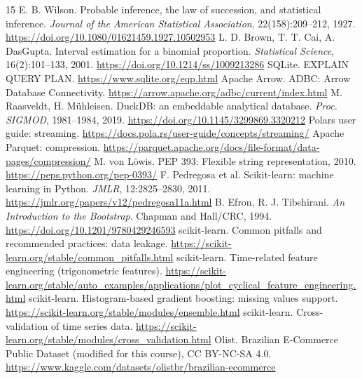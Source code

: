 \documentclass[11pt,a4paper]{article}
\begin{document}
\begin{thebibliography}{15}\small
{} E. B. Wilson. Probable inference, the law of succession, and statistical inference. \emph{Journal of the American Statistical Association}, 22(158):209--212, 1927. \url{https://doi.org/10.1080/01621459.1927.10502953}
 L. D. Brown, T. T. Cai, A. DasGupta. Interval estimation for a binomial proportion. \emph{Statistical Science}, 16(2):101--133, 2001. \url{https://doi.org/10.1214/ss/1009213286}
 SQLite. EXPLAIN QUERY PLAN. \url{https://www.sqlite.org/eqp.html}
 Apache Arrow. ADBC: Arrow Database Connectivity. \url{https://arrow.apache.org/adbc/current/index.html}
 M. Raasveldt, H. M\"uhleisen. DuckDB: an embeddable analytical database. \emph{Proc. SIGMOD}, 1981--1984, 2019. \url{https://doi.org/10.1145/3299869.3320212}
 Polars user guide: streaming. \url{https://docs.pola.rs/user-guide/concepts/streaming/}
 Apache Parquet: compression. \url{https://parquet.apache.org/docs/file-format/data-pages/compression/}
 M. von L\"owis. PEP 393: Flexible string representation, 2010. \url{https://peps.python.org/pep-0393/}
 F. Pedregosa et al. Scikit-learn: machine learning in Python. \emph{JMLR}, 12:2825--2830, 2011. \url{https://jmlr.org/papers/v12/pedregosa11a.html}
 B. Efron, R. J. Tibshirani. \emph{An Introduction to the Bootstrap}. Chapman and Hall/CRC, 1994. \url{https://doi.org/10.1201/9780429246593}
 scikit-learn. Common pitfalls and recommended practices: data leakage. \url{https://scikit-learn.org/stable/common_pitfalls.html}
 scikit-learn. Time-related feature engineering (trigonometric features). \url{https://scikit-learn.org/stable/auto_examples/applications/plot_cyclical_feature_engineering.html}
 scikit-learn. Histogram-based gradient boosting: missing values support. \url{https://scikit-learn.org/stable/modules/ensemble.html}
 scikit-learn. Cross-validation of time series data. \url{https://scikit-learn.org/stable/modules/cross_validation.html}
 Olist. Brazilian E-Commerce Public Dataset (modified for this course), CC BY-NC-SA 4.0. \url{https://www.kaggle.com/datasets/olistbr/brazilian-ecommerce}
\end{thebibliography}
\end{document}
